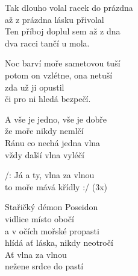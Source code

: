 \re{}
Tak dlouho volal racek do prázdna\\
až z prázdna lásku přivolal\\
Ten příboj doplul sem až z dna\\
dva racci tančí u mola.
 
Noc barví moře sametovou tuší\\
potom on vzlétne, ona netuší\\
zda už ji opustil\\
či pro ni hledá bezpečí. 
 
A vše je jedno, vše je dobře\\
že moře nikdy nemlčí\\
Ránu co nechá jedna vlna\\
vždy další vlna vyléčí 

\cho{}
/: Já a ty, vlna za vlnou\\
to moře mává křídly :/ (3x)

\re{}
Stařičký démon Poseidon\\
vidlice místo obočí\\
a v očích mořské propasti\\
hlídá ať láska, nikdy neotročí\\
Ať vlna za vlnou\\
nežene srdce do pastí 
 
\cho{}

\esong